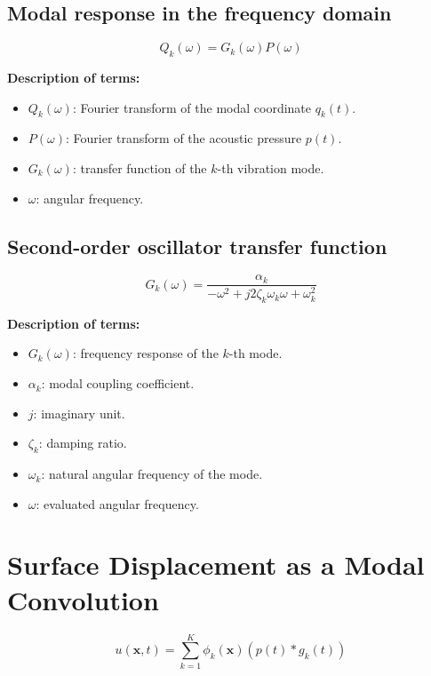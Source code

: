 \documentclass[11pt]{article}
\begin{document}
\subsection{Modal response in the frequency domain}

\begin{equation}
Q_k(\omega)
=
G_k(\omega) P(\omega)
\end{equation}

\textbf{Description of terms:}

\begin{itemize}
    \item $Q_k(\omega)$: Fourier transform of the modal coordinate $q_k(t)$.
    \item $P(\omega)$: Fourier transform of the acoustic pressure $p(t)$.
    \item $G_k(\omega)$: transfer function of the $k$-th vibration mode.
    \item $\omega$: angular frequency.
\end{itemize}

\subsection{Second-order oscillator transfer function}

\begin{equation}
G_k(\omega)
=
\frac{\alpha_k}
{-\omega^2
+
j 2 \zeta_k \omega_k \omega
+
\omega_k^2}
\end{equation}

\textbf{Description of terms:}

\begin{itemize}
    \item $G_k(\omega)$: frequency response of the $k$-th mode.
    \item $\alpha_k$: modal coupling coefficient.
    \item $j$: imaginary unit.
    \item $\zeta_k$: damping ratio.
    \item $\omega_k$: natural angular frequency of the mode.
    \item $\omega$: evaluated angular frequency.
\end{itemize}

\section{Surface Displacement as a Modal Convolution}

\begin{equation}
u(\bm{x},t)
=
\sum_{k=1}^{K}
\phi_k(\bm{x})
\left(
p(t) * g_k(t)
\right)
\end{equation}
\end{document}
